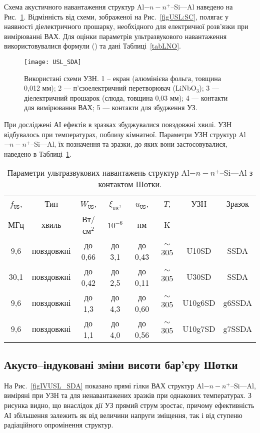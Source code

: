Схема акустичного навантаження структур Al$-n-n^+$--Si---Al наведено на Рис.~\ref{figUSL:SDA}.
Відмінність від схеми, зображеної на Рис.~\ref{figUSL:SC}, полягає у наявності діелектричного прошарку,
необхідного для електричної розв'язки при вимірюванні ВАХ.
Для оцінки параметрів ультразвукового навантаження використовувалися формули () та дані Таблиці~\ref{tabLNO}.

\begin{figure}[b]
\center
\texttt{[image: USL\_SDA]}%
\caption{\label{figUSL:SDA}
Використані схеми УЗН.
1 --  екран (алюмінієва фольга, товщина 0,012 мм);
2 --- п'єзоелектричний перетворювач (LiNbO$_3$);
3 --- діелектричний прошарок (слюда, товщина 0,03 мм);
4 --- контакти для вимірювання ВАХ;
5 --- контакти для збудження УЗ.
}
\end{figure}



При досліджені АІ ефектів в зразках збуджувалися повздовжні хвилі.
УЗН відбувалось при температурах, поблизу кімнатної.
Параметри УЗН структур Al$-n-n^+$--Si---Al, їх позначення та зразки, до яких вони застосовувалися, наведено в Таблиці~\ref{tabUSL:SD}.

\begin{table}
\caption{\label{tabUSL:SD}Параметри ультразвукових навантажень структур Al$-n-n^+$--Si---Al з контактом Шотки.
}
\begin{tabular}{|c|c|c|c|c|c|c|c|}
\hline
$f_\mathtt{US}$,&Тип&$W_{\mathtt{US}}$,&$\xi_{\mathtt{US}}$,&$u_{\mathtt{US}}$,&$T$,&УЗН&Зразок\\
МГц&хвиль&Вт/см$^2$&$10^{-6}$&нм&K&&\\
\hline
9,6&повздовжні&до 0,66&до 3,1&до 0,43&$\sim$305&U10SD&SSDA\\ \hline
30,1&повздовжні&до 0,42&до 2,5&до 0,11&$\sim$305&U30SD&SSDA\\ \hline
9,6&повздовжні&до 1,3&до 4,3&до 0,60&$\sim$305&U10g6SD&g6SSDA\\ \hline
9,6&повздовжні&до 1,1&до 4,0&до 0,56&$\sim$305&U10g7SD&g7SSDA\\ \hline
\end{tabular}
\end{table}


\subsection{Акусто--індуковані зміни висоти бар'єру Шотки}

На Рис.~\ref{figIVUSL_SDA} показано прямі гілки ВАХ структур Al$-n-n^+$--Si---Al, виміряні при УЗН та для ненавантажених
зразків при однакових температурах.
З рисунка видно, що внаслідок дії УЗ прямий струм зростає, причому
ефективність АІ збільшення залежить як від величини напруги зміщення, так і від ступеню радіаційного опромінення структур.

